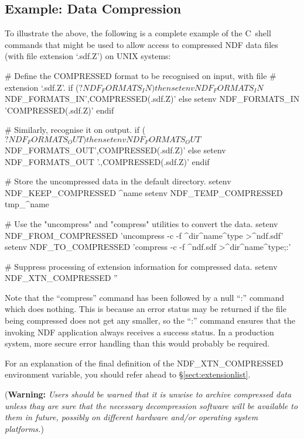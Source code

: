 \documentclass[11pt,twoside,nolof]{starlink}
\providecommand{\st}[1]{{\em{#1}}}
\begin{document}
\subsection{\label{sect:datacompression}Example: Data Compression}

To illustrate the above, the following is a complete example of the
C~shell commands that might be used to allow access to compressed NDF
data files (with file extension `.sdf.Z') on UNIX systems:

\begin{terminalv}
#  Define the COMPRESSED format to be recognised on input, with file
#  extension `.sdf.Z'.
      if ($?NDF_FORMATS_IN) then
         setenv NDF_FORMATS_IN $NDF_FORMATS_IN',COMPRESSED(.sdf.Z)'
      else
         setenv NDF_FORMATS_IN 'COMPRESSED(.sdf.Z)'
      endif

#  Similarly, recognise it on output.
      if ($?NDF_FORMATS_OUT) then
         setenv NDF_FORMATS_OUT $NDF_FORMATS_OUT',COMPRESSED(.sdf.Z)'
      else
         setenv NDF_FORMATS_OUT '.,COMPRESSED(.sdf.Z)'
      endif

#  Store the uncompressed data in the default directory.
      setenv NDF_KEEP_COMPRESSED ^name
      setenv NDF_TEMP_COMPRESSED tmp_^name

#  Use the "uncompress" and "compress" utilities to convert the data.
      setenv NDF_FROM_COMPRESSED 'uncompress -c -f ^dir^name^type >^ndf.sdf'
      setenv NDF_TO_COMPRESSED 'compress -c -f ^ndf.sdf >^dir^name^type;:'

#  Suppress processing of extension information for compressed data.
      setenv NDF_XTN_COMPRESSED ''
\end{terminalv}

Note that the ``compress'' command has been followed by a null ``:''
command which does nothing. This is because an error status may be
returned if the file being compressed does not get any smaller, so the
``:'' command ensures that the invoking NDF application always
receives a success status. In a production system, more secure error
handling than this would probably be required.

For an explanation of the final definition of the NDF\_XTN\_COMPRESSED
environment variable, you should refer ahead to
\S\ref{sect:extensionlist}.

({\bf{Warning:}} \st{Users should be warned that it is unwise to
archive compressed data unless thay are sure that the necessary
decompression software will be available to them in future, possibly
on different hardware and/or operating system platforms.})
\end{document}
